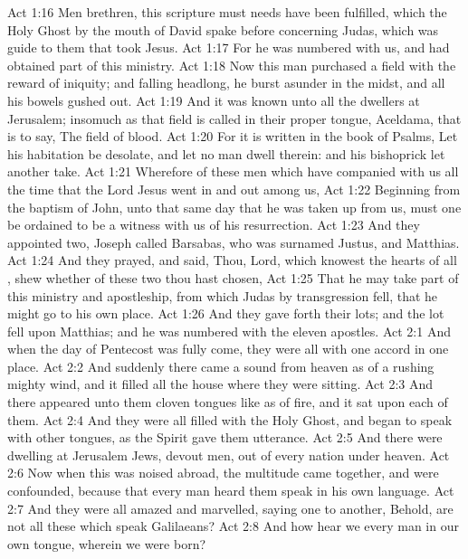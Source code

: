 \vs Act 1:16 Men  brethren, this scripture must needs have been fulfilled, which the Holy Ghost by the mouth of David spake before concerning Judas, which was guide to them that took Jesus.
\vs Act 1:17 For he was numbered with us, and had obtained part of this ministry.
\vs Act 1:18 Now this man purchased a field with the reward of iniquity; and falling headlong, he burst asunder in the midst, and all his bowels gushed out.
\vs Act 1:19 And it was known unto all the dwellers at Jerusalem; insomuch as that field is called in their proper tongue, Aceldama, that is to say, The field of blood.
\vs Act 1:20 For it is written in the book of Psalms, Let his habitation be desolate, and let no man dwell therein: and his bishoprick let another take.
\vs Act 1:21 Wherefore of these men which have companied with us all the time that the Lord Jesus went in and out among us,
\vs Act 1:22 Beginning from the baptism of John, unto that same day that he was taken up from us, must one be ordained to be a witness with us of his resurrection.
\vs Act 1:23 And they appointed two, Joseph called Barsabas, who was surnamed Justus, and Matthias.
\vs Act 1:24 And they prayed, and said, Thou, Lord, which knowest the hearts of all , shew whether of these two thou hast chosen,
\vs Act 1:25 That he may take part of this ministry and apostleship, from which Judas by transgression fell, that he might go to his own place.
\vs Act 1:26 And they gave forth their lots; and the lot fell upon Matthias; and he was numbered with the eleven apostles.
\vs Act 2:1 And when the day of Pentecost was fully come, they were all with one accord in one place.
\vs Act 2:2 And suddenly there came a sound from heaven as of a rushing mighty wind, and it filled all the house where they were sitting.
\vs Act 2:3 And there appeared unto them cloven tongues like as of fire, and it sat upon each of them.
\vs Act 2:4 And they were all filled with the Holy Ghost, and began to speak with other tongues, as the Spirit gave them utterance.
\vs Act 2:5 And there were dwelling at Jerusalem Jews, devout men, out of every nation under heaven.
\vs Act 2:6 Now when this was noised abroad, the multitude came together, and were confounded, because that every man heard them speak in his own language.
\vs Act 2:7 And they were all amazed and marvelled, saying one to another, Behold, are not all these which speak Galilaeans?
\vs Act 2:8 And how hear we every man in our own tongue, wherein we were born?
